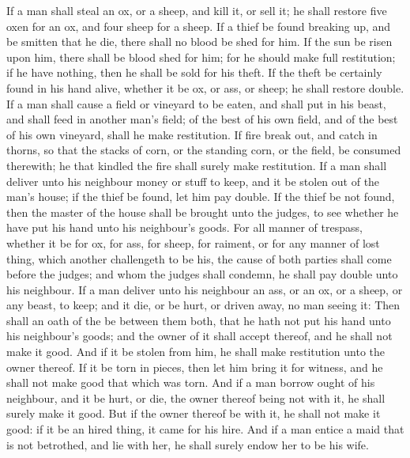 \begin{biblechapter} %
 If a man shall steal an ox, or a sheep, and kill it, or sell it; he shall restore five oxen for an ox, and four sheep for a sheep.
\verse If a thief be found breaking up, and be smitten that he die, there shall no blood be shed for him.
\verse If the sun be risen upon him, there shall be blood shed for him; for he should make full restitution; if he have nothing, then he shall be sold for his theft.
\verse If the theft be certainly found in his hand alive, whether it be ox, or ass, or sheep; he shall restore double.
\verse If a man shall cause a field or vineyard to be eaten, and shall put in his beast, and shall feed in another man's field; of the best of his own field, and of the best of his own vineyard, shall he make restitution.
\verse If fire break out, and catch in thorns, so that the stacks of corn, or the standing corn, or the field, be consumed therewith; he that kindled the fire shall surely make restitution.
\verse If a man shall deliver unto his neighbour money or stuff to keep, and it be stolen out of the man's house; if the thief be found, let him pay double.
\verse If the thief be not found, then the master of the house shall be brought unto the judges, to see whether he have put his hand unto his neighbour's goods.
\verse For all manner of trespass, whether it be for ox, for ass, for sheep, for raiment, or for any manner of lost thing, which another challengeth to be his, the cause of both parties shall come before the judges; and whom the judges shall condemn, he shall pay double unto his neighbour.
\verse If a man deliver unto his neighbour an ass, or an ox, or a sheep, or any beast, to keep; and it die, or be hurt, or driven away, no man seeing it:
\verse Then shall an oath of the \LORD be between them both, that he hath not put his hand unto his neighbour's goods; and the owner of it shall accept thereof, and he shall not make it good.
\verse And if it be stolen from him, he shall make restitution unto the owner thereof.
\verse If it be torn in pieces, then let him bring it for witness, and he shall not make good that which was torn.
\verse And if a man borrow ought of his neighbour, and it be hurt, or die, the owner thereof being not with it, he shall surely make it good.
\verse But if the owner thereof be with it, he shall not make it good: if it be an hired thing, it came for his hire.
 And if a man entice a maid that is not betrothed, and lie with her, he shall surely endow her to be his wife.

\end{biblechapter}

